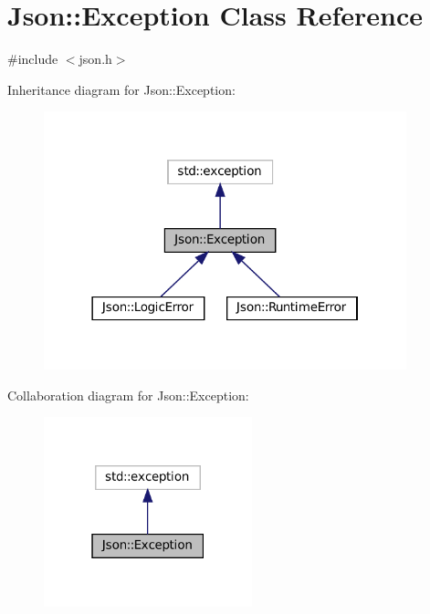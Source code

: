 \hypertarget{classJson_1_1Exception}{}\section{Json\+:\+:Exception Class Reference}
\label{classJson_1_1Exception}


{\ttfamily \#include $<$json.\+h$>$}



Inheritance diagram for Json\+:\+:Exception\+:
\nopagebreak
\begin{figure}[H]
\begin{center}
\leavevmode
\includegraphics[width=298pt]{classJson_1_1Exception__inherit__graph}
\end{center}
\end{figure}


Collaboration diagram for Json\+:\+:Exception\+:
\nopagebreak
\begin{figure}[H]
\begin{center}
\leavevmode
\includegraphics[width=171pt]{classJson_1_1Exception__coll__graph}
\end{center}
\end{figure}
